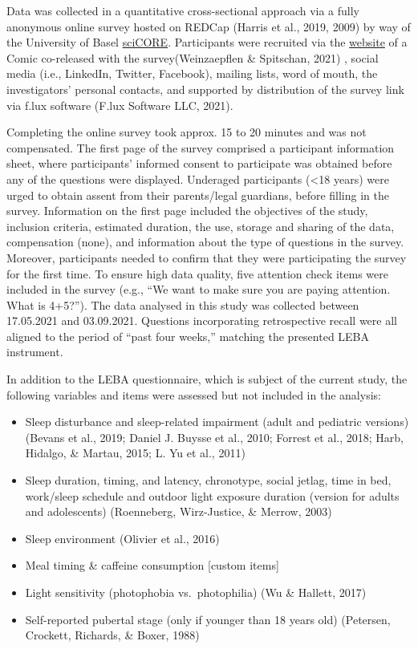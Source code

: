 \documentclass[
  english,
  man]{apa6}
\providecommand{\tightlist}{%
  \setlength{\itemsep}{0pt}\setlength{\parskip}{0pt}}
\begin{document}
Data was collected in a quantitative cross-sectional approach via a fully anonymous online survey hosted on REDCap (Harris et al., 2019, 2009) by way of the University of Basel \href{https://redcap.scicore.unibas.ch}{sciCORE}. Participants were recruited via the \href{https://enlightenyourclock.org/participate-in-research}{website} of a Comic co-released with the survey(Weinzaepflen \& Spitschan, 2021) , social media (i.e., LinkedIn, Twitter, Facebook), mailing lists, word of mouth, the investigators' personal contacts, and supported by distribution of the survey link via f.lux software (F.lux Software LLC, 2021).

Completing the online survey took approx. 15 to 20 minutes and was not compensated. The first page of the survey comprised a participant information sheet, where participants' informed consent to participate was obtained before any of the questions were displayed. Underaged participants (\textless18 years) were urged to obtain assent from their parents/legal guardians, before filling in the survey. Information on the first page included the objectives of the study, inclusion criteria, estimated duration, the use, storage and sharing of the data, compensation (none), and information about the type of questions in the survey. Moreover, participants needed to confirm that they were participating the survey for the first time. To ensure high data quality, five attention check items were included in the survey (e.g., ``We want to make sure you are paying attention. What is 4+5?''). The data analysed in this study was collected between 17.05.2021 and 03.09.2021. Questions incorporating retrospective recall were all aligned to the period of ``past four weeks,'' matching the presented LEBA instrument.

In addition to the LEBA questionnaire, which is subject of the current study, the following variables and items were assessed but not included in the analysis:

\begin{itemize}
\tightlist
\item
  Sleep disturbance and sleep-related impairment (adult and pediatric versions) (Bevans et al., 2019; Daniel J. Buysse et al., 2010; Forrest et al., 2018; Harb, Hidalgo, \& Martau, 2015; L. Yu et al., 2011)
\item
  Sleep duration, timing, and latency, chronotype, social jetlag, time in bed, work/sleep schedule and outdoor light exposure duration (version for adults and adolescents) (Roenneberg, Wirz-Justice, \& Merrow, 2003)
\item
  Sleep environment (Olivier et al., 2016)
\item
  Meal timing \& caffeine consumption {[}custom items{]}
\item
  Light sensitivity (photophobia vs.~photophilia) (Wu \& Hallett, 2017)
\item
  Self-reported pubertal stage (only if younger than 18 years old) (Petersen, Crockett, Richards, \& Boxer, 1988)
\end{itemize}
\end{document}
